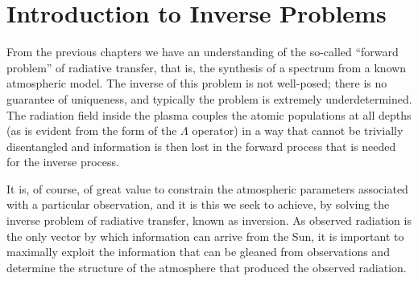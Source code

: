 \section{Introduction to Inverse Problems}\label{Sec:InverseProblems}

From the previous chapters we have an understanding of the so-called ``forward problem'' of radiative transfer, that is, the synthesis of a spectrum from a known atmospheric model.
The inverse of this problem is not well-posed; there is no guarantee of uniqueness, and typically the problem is extremely underdetermined.
The radiation field inside the plasma couples the atomic populations at all depths (as is evident from the form of the $\Lambda$ operator) in a way that cannot be trivially disentangled and information is then lost in the forward process that is needed for the inverse process.

It is, of course, of great value to constrain the atmospheric parameters associated with a particular observation, and it is this we seek to achieve, by solving the inverse problem of radiative transfer, known as inversion.
As observed radiation is the only vector by which information can arrive from the Sun, it is important to maximally exploit the information that can be gleaned from observations and determine the structure of the atmosphere that produced the observed radiation.

